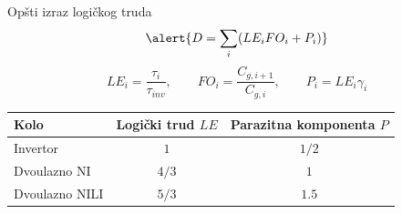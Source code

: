\begin{frame}[label=09_3-s044]{Opšti izraz logičkog truda}
\[\alert{D=\sum_i(LE_iFO_i+P_i)}\]
\[LE_i=\frac{\tau_i}{\tau_{inv}},\qquad
FO_i=\frac{C_{g,i+1}}{C_{g,i}},\qquad P_i=LE_i\gamma_i\]
\begin{center}\begin{tabular}{lcc}\toprule
Kolo & Logički trud $LE$ & Parazitna komponenta $P$\\\midrule
Invertor & $1$ & $1/2$\\
Dvoulazno NI & $4/3$ & $1$\\
Dvoulazno NILI & $5/3$ & $1.5$\\\bottomrule
\end{tabular}\end{center}
\end{frame}
